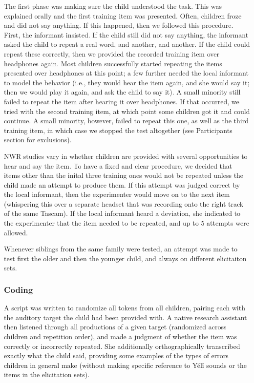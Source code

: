 \documentclass[english,,man,floatsintext]{apa6}
\begin{document}
The first phase was making sure the child understood the task. This was explained orally and the first training item was presented. Often, children froze and did not say anything. If this happened, then we followed this procedure. First, the informant insisted. If the child still did not say anything, the informant asked the child to repeat a real word, and another, and another. If the child could repeat these correctly, then we provided the recorded training item over headphones again. Most children successfully started repeating the items presented over headphones at this point; a few further needed the local informant to model the behavior (i.e., they would hear the item again, and she would say it; then we would play it again, and ask the child to say it). A small minority still failed to repeat the item after hearing it over headphones. If that occurred, we tried with the second training item, at which point some children got it and could continue. A small minority, however, failed to repeat this one, as well as the third training item, in which case we stopped the test altogether (see Participants section for exclusions).

NWR studies vary in whether children are provided with several opportunities to hear and say the item. To have a fixed and clear procedure, we decided that items other than the inital three training ones would not be repeated unless the child made an attempt to produce them. If this attempt was judged correct by the local informant, then the experimenter would move on to the next item (whispering this over a separate headset that was recording onto the right track of the same Tascam). If the local informant heard a deviation, she indicated to the experimenter that the item needed to be repeated, and up to 5 attempts were allowed.

Whenever siblings from the same family were tested, an attempt was made to test first the older and then the younger child, and always on different elicitaiton sets.

\hypertarget{coding}{%
\subsubsection{Coding}\label{coding}}

A script was written to randomize all tokens from all children, pairing each with the auditory target the child had been provided with. A native research assistant then listened through all productions of a given target (randomized across children and repetition order), and made a judgment of whether the item was correctly or incorrectly repeated. She additionally orthographically transcribed exactly what the child said, providing some examples of the types of errors children in general make (without making specific reference to Yélî sounds or the items in the elicitation sets).
\end{document}
